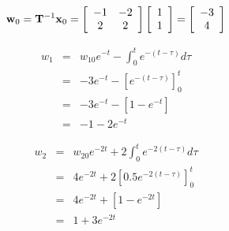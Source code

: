 \[
{\bf{w}}_0  = {\bf{T}}^{ - 1} {\bf{x}}_0  = \left[ {\begin{array}{*{20}c}
   { - 1} & { - 2}  \\
   2 & 2  \\
\end{array}} \right]\left[ {\begin{array}{*{20}c}
   1  \\
   1  \\
\end{array}} \right] = \left[ {\begin{array}{*{20}c}
   { - 3}  \\
   4  \\
\end{array}} \right]
\]


\begin{eqnarray*}
	w_1 & = & w_{10}e^{-t}-\int_0^t e^{-(t-\tau)} d\tau \\
	    & = & -3e^{-t}-\left[e^{-(t-\tau)}\right]_0^t \\
	    & = & -3e^{-t}-\left[1 - e^{-t}\right] \\
	    & = & -1 -2e^{-t}
\end{eqnarray*}

\begin{eqnarray*}
	w_2 & = & w_{20}e^{-2t}+2\int_0^t e^{-2(t-\tau)} d\tau \\
	    & = & 4e^{-2t}+2\left[0.5e^{-2(t-\tau)}\right]_0^t \\
	    & = & 4e^{-2t}+\left[1 - e^{-2t}\right] \\
	    & = & 1 + 3e^{-2t}
\end{eqnarray*}

